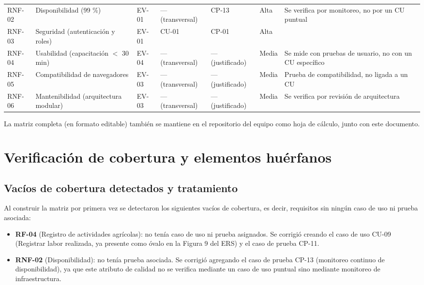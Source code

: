 \documentclass[12pt,a4paper]{article}
\begin{document}
\begin{longtable}{@{}p{1.2cm}p{3.5cm}p{2.5cm}p{2.5cm}p{2cm}p{1.2cm}p{3.5cm}@{}}
RNF-02 & Disponibilidad (99 \%) & EV-01 & --- (transversal) & CP-13 & Alta & Se verifica por monitoreo, no por un CU puntual \\
RNF-03 & Seguridad (autenticación y roles) & EV-01 & CU-01 & CP-01 & Alta & \\
RNF-04 & Usabilidad (capacitación $<$ 30 min) & EV-04 & --- (transversal) & --- (justificado) & Media & Se mide con pruebas de usuario, no con un CU específico \\
RNF-05 & Compatibilidad de navegadores & EV-03 & --- (transversal) & --- (justificado) & Media & Prueba de compatibilidad, no ligada a un CU \\
RNF-06 & Mantenibilidad (arquitectura modular) & EV-03 & --- (transversal) & --- (justificado) & Media & Se verifica por revisión de arquitectura \\
\bottomrule
\end{longtable}

La matriz completa (en formato editable) también se mantiene en el repositorio del equipo como hoja de cálculo, junto con este documento.

\section{ Verificación de cobertura y elementos huérfanos }

\subsection{Vacíos de cobertura detectados y tratamiento}

Al construir la matriz por primera vez se detectaron los siguientes vacíos de cobertura, es decir, requisitos sin ningún caso de uso ni prueba asociada:

\begin{itemize}[leftmargin=*]
    \item \textbf{RF-04} (Registro de actividades agrícolas): no tenía caso de uso ni prueba asignados. Se corrigió creando el caso de uso CU-09 (Registrar labor realizada, ya presente como óvalo en la Figura 9 del ERS) y el caso de prueba CP-11.
    \item \textbf{RNF-02} (Disponibilidad): no tenía prueba asociada. Se corrigió agregando el caso de prueba CP-13 (monitoreo continuo de disponibilidad), ya que este atributo de calidad no se verifica mediante un caso de uso puntual sino mediante monitoreo de infraestructura.
\end{itemize}
\end{document}
